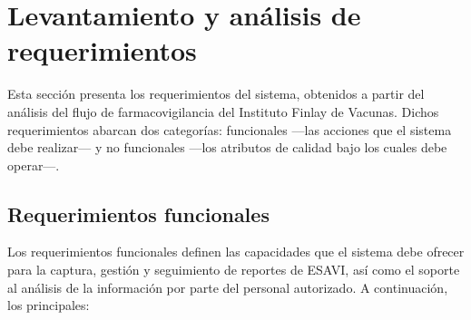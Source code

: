 \section{Levantamiento y análisis de requerimientos}
\label{section:requerimientos}

Esta sección presenta los requerimientos del sistema, obtenidos a partir del análisis del flujo de farmacovigilancia del Instituto Finlay de Vacunas. 
Dichos requerimientos abarcan dos categorías: funcionales —las acciones que el sistema debe realizar— y no funcionales —los atributos de calidad bajo los cuales debe operar—.

\subsection{Requerimientos funcionales}
\label{subsection:requerimientos_funcionales}

Los requerimientos funcionales definen las capacidades que el sistema debe ofrecer para la captura, gestión y seguimiento de reportes de ESAVI, así como el soporte al análisis de la información por parte del personal autorizado. 
A continuación, los principales:

